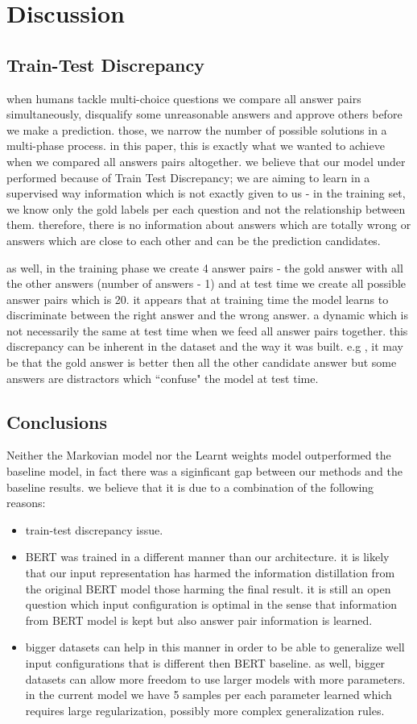 \documentclass{article}
\begin{document}
\section{Discussion}
\subsection{Train-Test Discrepancy}
when humans tackle multi-choice questions we compare all answer pairs simultaneously, disqualify some unreasonable answers and approve others before we make a prediction. those, we narrow the number of possible solutions in a multi-phase process. in this paper, this is exactly what we wanted to achieve when we compared all answers pairs altogether. we believe that our model under performed because of Train Test Discrepancy; we are aiming to learn in a supervised way information which is not exactly given to us - in the training set, we know only the gold labels per each question and not the relationship between them. therefore, there is no information about answers which are totally wrong or answers which are close to each other and can be the prediction candidates. 

as well, in the training phase we create 4 answer pairs - the gold answer with all the other answers (number of answers - 1) and at test time we create all possible answer pairs which is 20. it appears that at training time the model learns to discriminate between the right answer and the wrong answer. a dynamic which is not necessarily the same at test time when we feed all answer pairs together. this discrepancy can be inherent in the dataset and the way it was built. e.g , it may be that the gold answer is better then all the other candidate answer but some answers are distractors which ``confuse" the model at test time.

\subsection{Conclusions}
Neither the Markovian model nor the Learnt weights model outperformed the baseline model, in fact there was a siginficant gap between our methods and the baseline results. we believe that it is due to a combination of the following reasons:
\begin{itemize}
\item train-test discrepancy issue.
\item BERT was trained in a different manner than our architecture. it is likely  that our input representation has harmed the information distillation from the original BERT model those harming the final result. it is still an open question which input configuration is optimal in the sense that information from BERT model is kept but also answer pair information is learned. 
\item  bigger datasets can help in this manner in order to be able to generalize well input configurations that is different then BERT baseline. as well, bigger datasets  can allow more freedom to use larger models with more parameters. in the current model we have 5 samples per each parameter learned which requires large regularization, possibly more complex generalization rules.
\end{itemize}
\end{document}
